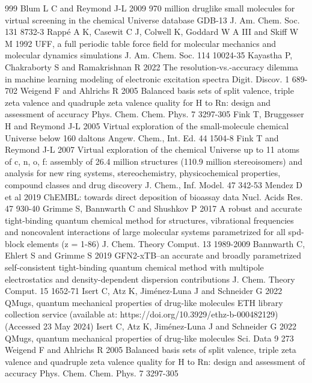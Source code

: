 \documentclass[12pt]{article}
\begin{document}
\begin{thebibliography}{999}
 Blum L C and Reymond J-L 2009 970 million druglike small molecules for virtual screening in the chemical Universe database GDB-13 J. Am. Chem. Soc. 131 8732-3
 Rappé A K, Casewit C J, Colwell K, Goddard W A III and Skiff W M 1992 UFF, a full periodic table force field for molecular mechanics and molecular dynamics simulations J. Am. Chem. Soc. 114 10024-35
 Kayastha P, Chakraborty S and Ramakrishnan R 2022 The resolution-vs.-accuracy dilemma in machine learning modeling of electronic excitation spectra Digit. Discov. 1 689-702
 Weigend F and Ahlrichs R 2005 Balanced basis sets of split valence, triple zeta valence and quadruple zeta valence quality for H to Rn: design and assessment of accuracy Phys. Chem. Chem. Phys. 7 3297-305
 Fink T, Bruggesser H and Reymond J-L 2005 Virtual exploration of the small-molecule chemical Universe below 160 daltons Angew. Chem., Int. Ed. 44 1504-8
 Fink T and Reymond J-L 2007 Virtual exploration of the chemical Universe up to 11 atoms of c, n, o, f: assembly of 26.4 million structures (110.9 million stereoisomers) and analysis for new ring systems, stereochemistry, physicochemical properties, compound classes and drug discovery J. Chem., Inf. Model. 47 342-53
 Mendez D et al 2019 ChEMBL: towards direct deposition of bioassay data Nucl. Acids Res. 47 930-40
 Grimme S, Bannwarth C and Shushkov P 2017 A robust and accurate tight-binding quantum chemical method for structures, vibrational frequencies and noncovalent interactions of large molecular systems parametrized for all spd-block elements (z = 1-86) J. Chem. Theory Comput. 13 1989-2009
 Bannwarth C, Ehlert S and Grimme S 2019 GFN2-xTB--an accurate and broadly parametrized self-consistent tight-binding quantum chemical method with multipole electrostatics and density-dependent dispersion contributions J. Chem. Theory Comput. 15 1652-71
 Isert C, Atz K, Jiménez-Luna J and Schneider G 2022 QMugs, quantum mechanical properties of drug-like molecules ETH library collection service (available at: https://doi.org/10.3929/ethz-b-000482129) (Accessed 23 May 2024)
 Isert C, Atz K, Jiménez-Luna J and Schneider G 2022 QMugs, quantum mechanical properties of drug-like molecules Sci. Data 9 273
 Weigend F and Ahlrichs R 2005 Balanced basis sets of split valence, triple zeta valence and quadruple zeta valence quality for H to Rn: design and assessment of accuracy Phys. Chem. Chem. Phys. 7 3297-305

\end{thebibliography}
\end{document}

